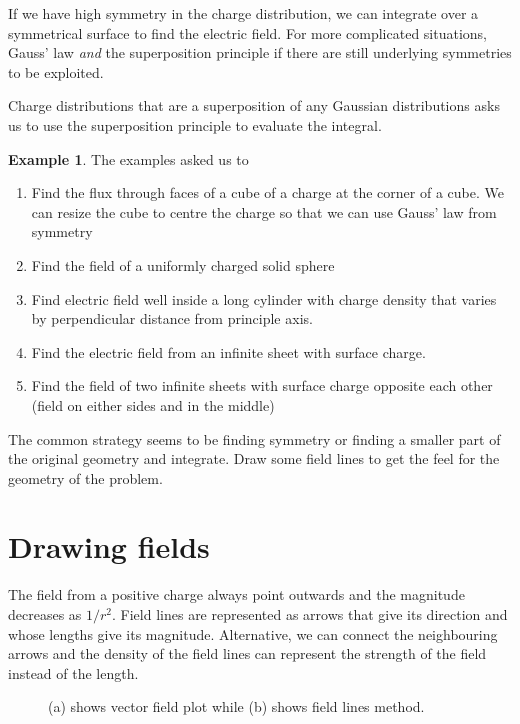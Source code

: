 \documentclass[12pt,chapterprefix=false,dvipsnames]{scrbook}
\theoremstyle{dotless}
\theoremstyle{definition}
\newtheorem{protoexample}{Example}[section]
\newenvironment{example}
{\colorlet{shadecolor}{red!15}\begin{shaded}\begin{protoexample}}
			{\end{protoexample}\end{shaded}}
\begin{document}
If we have high symmetry in the charge distribution, we can
integrate over a symmetrical surface to find the electric field.
For more complicated situations, Gauss' law
\textit{and} the superposition principle if there
are still underlying symmetries to be exploited.

Charge distributions that are a superposition of any Gaussian
distributions asks us to use the superposition principle to
evaluate the integral.

\begin{example}
	The examples asked us to
	\begin{enumerate}
		\item Find the flux through faces of a cube of a charge at the corner
		      of a cube. We can resize the cube to centre the charge so that
		      we can use Gauss' law from symmetry
		\item Find the field of a uniformly charged solid sphere \item Find electric field well inside a long cylinder with charge
		      density that varies by perpendicular distance from principle
		      axis.
		\item Find the electric field from an infinite sheet with surface
		      charge.
		\item Find the field of two infinite sheets with surface charge
		      opposite each other (field on either sides and in the middle)
	\end{enumerate}

	The common strategy seems to be finding symmetry or finding a
	smaller part of the original geometry and integrate. Draw some
	field lines to get the feel for the geometry of the problem.

\end{example}

\section{Drawing fields}%
\label{sec:drawing_fields}

The field from a positive charge always point outwards and the
magnitude decreases as $1/r^{2}$. Field lines are
represented as arrows that give its direction and whose lengths
give its magnitude. Alternative, we can connect the neighbouring
arrows and the density of the field lines can represent the
strength of the field instead of the length.

\begin{figure}
	\centering
	
	\caption{(a) shows vector field plot while (b) shows field lines method.}
\end{figure}
\end{document}
